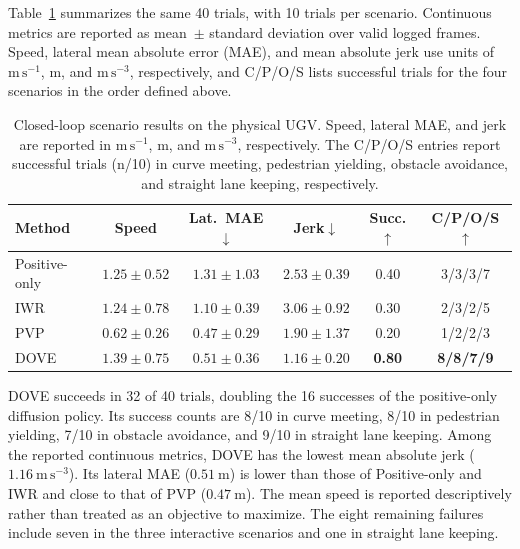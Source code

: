 \documentclass[9pt,journal]{IEEEtran}
\newcommand{\DOVE}{DOVE}
\begin{document}
Table~\ref{tab:ugv_closedloop} summarizes the same 40 trials, with 10 trials per scenario. Continuous metrics are reported as mean~\(\pm\) standard deviation over valid logged frames. Speed, lateral mean absolute error (MAE), and mean absolute jerk use units of \(\mathrm{m\,s^{-1}}\), \(\mathrm{m}\), and \(\mathrm{m\,s^{-3}}\), respectively, and C/P/O/S lists successful trials for the four scenarios in the order defined above.

\begin{table}[!t]
\centering
\caption{{\normalfont Closed-loop scenario results on the physical UGV.  Speed, lateral MAE, and jerk are reported in $\mathrm{m\,s^{-1}}$, $\mathrm{m}$, and $\mathrm{m\,s^{-3}}$, respectively. The C/P/O/S entries report successful trials (n/10) in curve meeting, pedestrian yielding, obstacle avoidance, and straight lane keeping, respectively.}}
\label{tab:ugv_closedloop}
\footnotesize
\setlength{\tabcolsep}{1pt}
\renewcommand{\arraystretch}{1.03}
\begin{tabular*}{0.96\columnwidth}{@{\extracolsep{\fill}}lccccc@{}}
\toprule
Method & Speed & Lat.\ MAE$\downarrow$ & Jerk$\downarrow$ & Succ.$\uparrow$ & C/P/O/S$\uparrow$ \\
\midrule
Positive-only & $1.25{\pm}0.52$ & $1.31{\pm}1.03$ & $2.53{\pm}0.39$ & 0.40 & 3/3/3/7\\
IWR~\cite{mandlekar2020iwr} & $1.24{\pm}0.78$ & $1.10{\pm}0.39$ & $3.06{\pm}0.92$ & 0.30 & 2/3/2/5\\
PVP~\cite{peng2023pvp} & $0.62{\pm}0.26$ & $\bm{0.47}{\pm}0.29$ & $1.90{\pm}1.37$ & 0.20 & 1/2/2/3\\
\DOVE{} & $\bm{1.39}{\pm}0.75$ & $0.51{\pm}0.36$ & $\bm{1.16}{\pm}0.20$ & \textbf{0.80} & \textbf{8/8/7/9}\\
\bottomrule
\end{tabular*}
\end{table}

\DOVE{} succeeds in 32 of 40 trials, doubling the 16
successes of the positive-only diffusion policy. Its
success counts are 8/10 in curve meeting, 8/10 in
pedestrian yielding, 7/10 in obstacle avoidance, and
9/10 in straight lane keeping. Among the reported
continuous metrics, \DOVE{} has the lowest mean absolute
jerk ($1.16~\mathrm{m\,s^{-3}}$). Its lateral MAE
($0.51~\mathrm{m}$) is lower than those of Positive-only
and IWR and close to that of PVP ($0.47~\mathrm{m}$).
The mean speed is reported descriptively rather than
treated as an objective to maximize. The eight remaining
failures include seven in the three interactive scenarios
and one in straight lane keeping.
\end{document}

